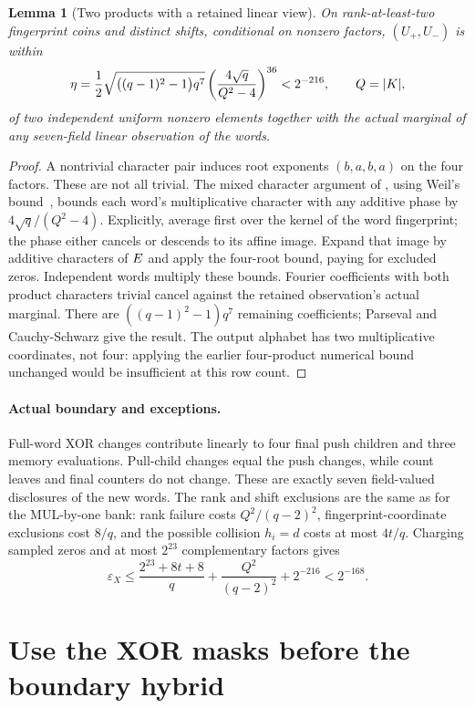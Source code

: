 \documentclass[11pt]{article}
\newtheorem{lemma}{Lemma}
\begin{document}
\begin{lemma}[Two products with a retained linear view]
On rank-at-least-two fingerprint coins and distinct shifts, conditional on nonzero factors, $(U_+,U_-)$ is within
\[
 \eta=\frac12\sqrt{\bigl((q-1)^2-1\bigr)q^7}
       \left(\frac{4\sqrt q}{Q^2-4}\right)^{36}<2^{-216},
 \qquad Q=|K|,
\]
of two independent uniform nonzero elements together with the actual marginal of any seven-field linear observation of the words.
\end{lemma}
\begin{proof}
A nontrivial character pair induces root exponents $(b,a,b,a)$ on the four factors. These are not all trivial. The mixed character argument of , using Weil's bound~\cite{winger}, bounds each word's multiplicative character with any additive phase by $4\sqrt q/(Q^2-4)$. Explicitly, average first over the kernel of the word fingerprint; the phase either cancels or descends to its affine image. Expand that image by additive characters of $E$ and apply the four-root bound, paying for excluded zeros. Independent words multiply these bounds. Fourier coefficients with both product characters trivial cancel against the retained observation's actual marginal. There are $((q-1)^2-1)q^7$ remaining coefficients; Parseval and Cauchy-Schwarz give the result. The output alphabet has two multiplicative coordinates, not four: applying the earlier four-product numerical bound unchanged would be insufficient at this row count.
\end{proof}

\paragraph{Actual boundary and exceptions.} Full-word XOR changes contribute linearly to four final push children and three memory evaluations. Pull-child changes equal the push changes, while count leaves and final counters do not change. These are exactly seven field-valued disclosures of the new words. The rank and shift exclusions are the same as for the MUL-by-one bank: rank failure costs $Q^2/(q-2)^2$, fingerprint-coordinate exclusions cost $8/q$, and the possible collision $h_i=d$ costs at most $4t/q$. Charging sampled zeros and at most $2^{23}$ complementary factors gives
\[
 \varepsilon_X\le\frac{2^{23}+8t+8}{q}
             +\frac{Q^2}{(q-2)^2}+2^{-216}<2^{-168}.
\]

\section{Use the XOR masks before the boundary hybrid}
\end{document}

